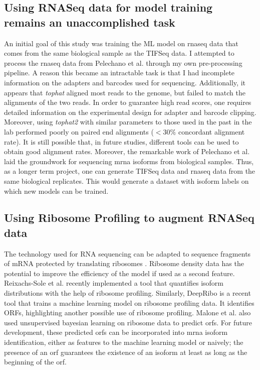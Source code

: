 \documentclass[12pt]{article}
\begin{document}
\subsection{Using RNASeq data for model training remains an unaccomplished task} \label{steinmetz_rna}

An initial goal of this study was training the ML model on \acrshort{rnaseq} data that comes from the same biological sample as the TIFSeq data. I attempted to process the \acrshort{rnaseq} data from Pelechano et al. \cite{Pelechano2013} through my own pre-processing pipeline. A reason this became an intractable task is that I had incomplete information on the adapters and barcodes used for sequencing. Additionally, it appears that \textit{tophat} aligned most reads to the genome, but failed to match the alignments of the two reads. In order to guarantee high read scores, one requires detailed information on the experimental design for adapter and barcode clipping. Moreover, using \textit{tophat2} with similar parameters to those used in the past in the lab performed poorly on paired end alignments ($<30\%$ concordant alignment rate). It is still possible that, in future studies, different tools can be used to obtain good alignment rates. Moreover, the remarkable work of Pelechano et al. \cite{Pelechano2013} laid the groundwork for sequencing \acrshort{mrna} isoforms from biological samples. Thus, as a longer term project, one can generate TIFSeq data and \acrshort{rnaseq} data from the same biological replicates. This would generate a dataset with isoform labels on which new models can be trained.   

\subsection{Using Ribosome Profiling to augment RNASeq data}
The technology used for RNA sequencing can be adapted to sequence fragments of mRNA protected by translating ribosomes \cite{Ingolia2012}. Ribosome density data has the potential to improve the efficiency of the model if used as a second feature. Reixachs-Sole et al. \cite{ReixachsSol2020} recently implemented a tool that quantifies isoform distributions with the help of ribosome profiling. Similarly, DeepRibo \cite{Clauwaert2019} is a recent tool that trains a machine learning model on ribosome profiling data. It identifies ORFs, highlighting another possible use of ribosome profiling. Malone et al. \cite{Malone2017} also used unsupervised bayesian learning on ribosome data to predict \acrshort{orf}s. For future development, these predicted \acrshort{orf}s can be incorporated into \acrshort{mrna} isoform identification, either as features to the machine learning model or naively; the presence of an \acrshort{orf} guarantees the existence of an isoform at least as long as the beginning of the \acrshort{orf}.  
 
\end{document}
